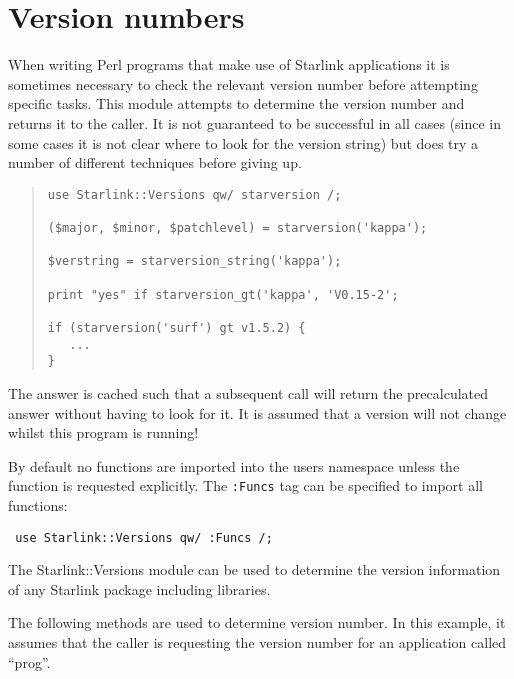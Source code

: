 \documentclass[twoside,11pt]{article}
\newenvironment{myquote}{\begin{quote}\begin{small}}{\end{small}\end{quote}}
\renewcommand{\_}{\texttt{\symbol{95}}}
\begin{document}
\section{Version numbers}


When writing Perl programs that make use of Starlink applications
it is sometimes necessary to check the relevant version number
before attempting specific tasks. This module attempts to determine
the version number and returns it to the caller. It is not guaranteed
to be successful in all cases (since in some cases it is not
clear where to look for the version string) but does try a number of different
techniques before giving up.

\begin{myquote}
\begin{verbatim}
use Starlink::Versions qw/ starversion /;

($major, $minor, $patchlevel) = starversion('kappa');

$verstring = starversion_string('kappa');

print "yes" if starversion_gt('kappa', 'V0.15-2';

if (starversion('surf') gt v1.5.2) {
   ...
}
\end{verbatim}
\end{myquote}



The answer is cached such that a subsequent call will return the
precalculated answer without having to look for it. It is assumed that
a version will not change whilst this program is running!



By default no functions are imported into the users namespace unless
the function is requested explicitly. The \texttt{:Funcs} tag can be
specified to import all functions:

\begin{verbatim}
 use Starlink::Versions qw/ :Funcs /;
\end{verbatim}

The Starlink::Versions module can be used to determine the version
information of any Starlink package including libraries.

The following methods are used to determine version number.
In this example, it assumes that the caller is requesting the
version number for an application called ``prog''.
\end{document}
